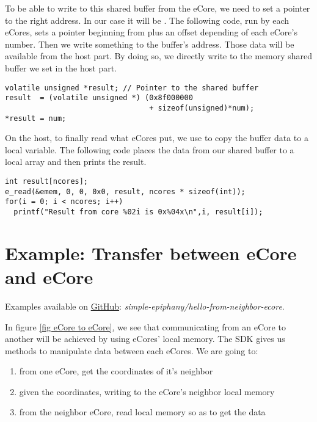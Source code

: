 To be able to write to this shared buffer from the \gls{eCore}, we need to set a pointer to the right address. In our case it will be . The following code, run by each \glspl{eCore}, sets a pointer beginning from  plus an offset depending of each \gls{eCore}'s number. Then we write something to the buffer's address. Those data will be available from the host part. By doing so, we directly write to the memory shared buffer we set in the host part.

\begin{lstlisting}
volatile unsigned *result; // Pointer to the shared buffer
result  = (volatile unsigned *) (0x8f000000 
                                 + sizeof(unsigned)*num);
*result = num;
\end{lstlisting}

On the host, to finally read what \glspl{eCore} put, we use  to copy the buffer data to a local variable. The following code places the data from our shared buffer to a local array and then prints the result.

\begin{lstlisting}
int result[ncores];
e_read(&emem, 0, 0, 0x0, result, ncores * sizeof(int));
for(i = 0; i < ncores; i++)
  printf("Result from core %02i is 0x%04x\n",i, result[i]);
\end{lstlisting}

\section[Example 2]{Example: Transfer between \gls{eCore} and \gls{eCore}}

Examples available on \href{https://github.com/nkcr/parallella-computing/blob/master/simple-epiphany/hello-from-neighbor-ecore/emain.c}{GitHub}\cite{githubproject}: \textit{simple-epiphany/hello-from-neighbor-ecore}.

In figure \ref{fig eCore to eCore}, we see that communicating from an \gls{eCore} to another will be achieved by using \glspl{eCore}' local memory. The \gls{SDK} gives us methods to manipulate data between each \glspl{eCore}. We are going to:

\begin{enumerate}
  \item from one \gls{eCore}, get the coordinates of it's neighbor
  \item given the coordinates, writing to the \gls{eCore}'s neighbor local memory
  \item from the neighbor \gls{eCore}, read local memory so as to get the data
\end{enumerate}


